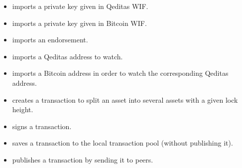 \begin{itemize}
\item {} imports a private key given in Qeditas WIF.
\item {} imports a private key given in Bitcoin WIF.
\item {} imports an endorsement.
\item {} imports a Qeditas address to watch.
\item {} imports a Bitcoin address in order to watch the corresponding Qeditas address.
\item {} creates a transaction to split an asset
into several assets with a given lock height.
\item {} signs a transaction.
\item {} saves a transaction to the local transaction pool (without publishing it).
\item {} publishes a transaction by sending it to peers.
\end{itemize}

